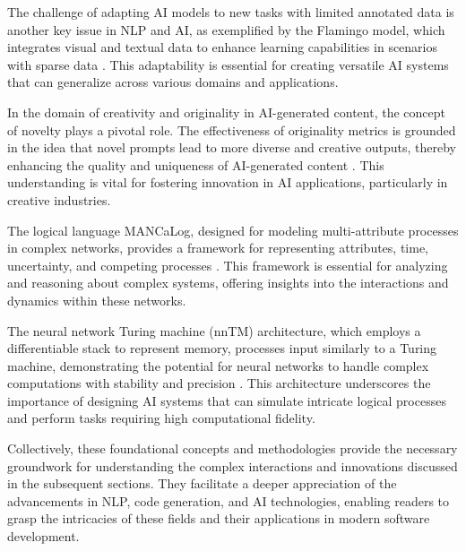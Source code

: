 The challenge of adapting AI models to new tasks with limited annotated data is another key issue in NLP and AI, as exemplified by the Flamingo model, which integrates visual and textual data to enhance learning capabilities in scenarios with sparse data \cite{alayrac2022flamingo}. This adaptability is essential for creating versatile AI systems that can generalize across various domains and applications.



In the domain of creativity and originality in AI-generated content, the concept of novelty plays a pivotal role. The effectiveness of originality metrics is grounded in the idea that novel prompts lead to more diverse and creative outputs, thereby enhancing the quality and uniqueness of AI-generated content \cite{palmini2024patternscreativityuserinput}. This understanding is vital for fostering innovation in AI applications, particularly in creative industries.



The logical language MANCaLog, designed for modeling multi-attribute processes in complex networks, provides a framework for representing attributes, time, uncertainty, and competing processes \cite{shakarian2022reasoningcomplexnetworkslogic}. This framework is essential for analyzing and reasoning about complex systems, offering insights into the interactions and dynamics within these networks.



The neural network Turing machine (nnTM) architecture, which employs a differentiable stack to represent memory, processes input similarly to a Turing machine, demonstrating the potential for neural networks to handle complex computations with stability and precision \cite{stogin2022provablystableneuralnetwork}. This architecture underscores the importance of designing AI systems that can simulate intricate logical processes and perform tasks requiring high computational fidelity.



Collectively, these foundational concepts and methodologies provide the necessary groundwork for understanding the complex interactions and innovations discussed in the subsequent sections. They facilitate a deeper appreciation of the advancements in NLP, code generation, and AI technologies, enabling readers to grasp the intricacies of these fields and their applications in modern software development.











